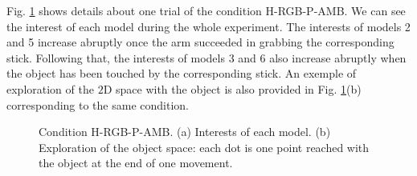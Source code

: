 \documentclass[10pt,letterpaper]{article}
\begin{document}
	Fig. \ref{res_interests} shows details about one trial of the condition H-RGB-P-AMB. 
	We can see the interest of each model during the whole experiment.
	The interests of models 2 and 5 increase abruptly once the arm succeeded in grabbing the corresponding stick.
	Following that, the interests of models 3 and 6 also increase abruptly when the object has been touched by the corresponding stick.
	An exemple of exploration of the $2$D space with the object is also provided in Fig. \ref{res_interests}(b) corresponding to the same condition.
	
	\begin{figure}[ht]
		\centering
		\caption{Condition H-RGB-P-AMB. (a) Interests of each model. (b) Exploration of the object space: each dot is one point reached with the object at the end of one movement.}
		\label{res_interests}
	\end{figure}
\end{document}
